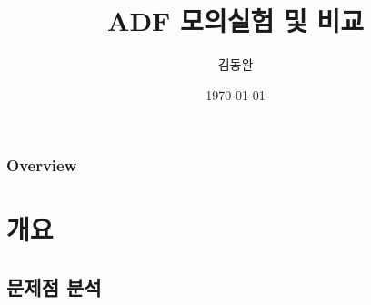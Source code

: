 \documentclass{beamer}
\title[]{ADF 모의실험 및 비교} %
\author{김동완} %
\institute[고려대학교 정책대학원] %
{
고려대학교 정책대학원\\ %
데이터 통계학과\\
\medskip
\textit{} %
}
\date{\today} %
\begin{document}
\begin{frame}
\titlepage %
\end{frame}

\begin{frame}
\frametitle{Overview} %
\tableofcontents %
\end{frame}




\section{개요} %

\subsection{문제점 분석} %
\end{document}

